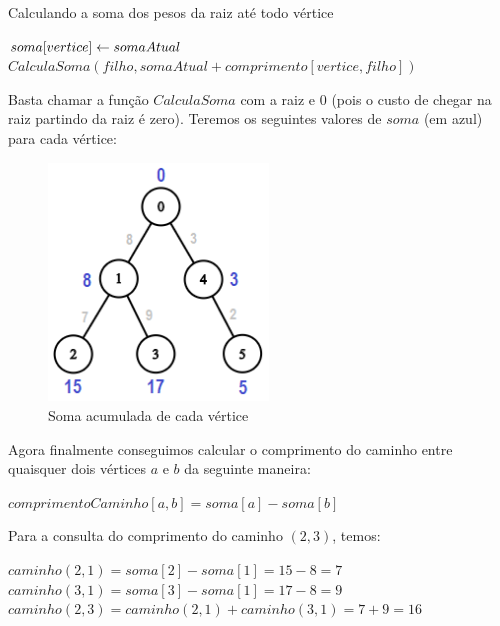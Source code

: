 \begin{algorithm}[H]
\caption{Calculando a soma dos pesos da raiz até todo vértice}
\begin{algorithmic}[1]
    \State $soma[vertice] \leftarrow somaAtual$
        \State $CalculaSoma(filho, somaAtual + comprimento[vertice, filho])$
    \EndFor
\EndFunction
\end{algorithmic}
\end{algorithm}

Basta chamar a função $CalculaSoma$ com a raiz e $0$ (pois o custo de chegar na raiz partindo da raiz é zero). Teremos os seguintes valores de $soma$ (em azul) para cada vértice:

\begin{figure}[htb]
\begin{center}
\includegraphics[width=5.85cm]{images/ants10-graph2.png}
\end{center}
\caption{\label{fig:arvore-euler2}Soma acumulada de cada vértice}
\end{figure}

\vspace{2cm}

Agora finalmente conseguimos calcular o comprimento do caminho entre quaisquer dois vértices $a$ e $b$ da seguinte maneira:

\begin{center}
$comprimentoCaminho[a, b] = soma[a] - soma[b]$
\end{center}

Para a consulta do comprimento do caminho $(2, 3)$, temos:
\begin{center}
$caminho(2, 1) = soma[2] - soma[1] = 15 - 8 = 7$\\
$caminho(3, 1) = soma[3] - soma[1] = 17 - 8 = 9$\\
$caminho(2, 3) = caminho (2, 1) + caminho(3, 1) = 7 + 9 = 16$
\end{center}

